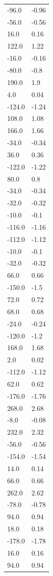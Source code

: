 \begin{longtable}{ll}
-96.0 & -0.96 \\
-56.0 & -0.56 \\
16.0 & 0.16 \\
122.0 & 1.22 \\
-16.0 & -0.16 \\
-80.0 & -0.8 \\
190.0 & 1.9 \\
4.0 & 0.04 \\
-124.0 & -1.24 \\
108.0 & 1.08 \\
166.0 & 1.66 \\
-34.0 & -0.34 \\
36.0 & 0.36 \\
-122.0 & -1.22 \\
80.0 & 0.8 \\
-34.0 & -0.34 \\
-32.0 & -0.32 \\
-10.0 & -0.1 \\
-116.0 & -1.16 \\
-112.0 & -1.12 \\
-10.0 & -0.1 \\
-32.0 & -0.32 \\
66.0 & 0.66 \\
-150.0 & -1.5 \\
72.0 & 0.72 \\
68.0 & 0.68 \\
-24.0 & -0.24 \\
-120.0 & -1.2 \\
168.0 & 1.68 \\
2.0 & 0.02 \\
-112.0 & -1.12 \\
62.0 & 0.62 \\
-176.0 & -1.76 \\
268.0 & 2.68 \\
-8.0 & -0.08 \\
232.0 & 2.32 \\
-56.0 & -0.56 \\
-154.0 & -1.54 \\
14.0 & 0.14 \\
66.0 & 0.66 \\
262.0 & 2.62 \\
-78.0 & -0.78 \\
94.0 & 0.94 \\
18.0 & 0.18 \\
-178.0 & -1.78 \\
16.0 & 0.16 \\
94.0 & 0.94 \\

\end{longtable}
